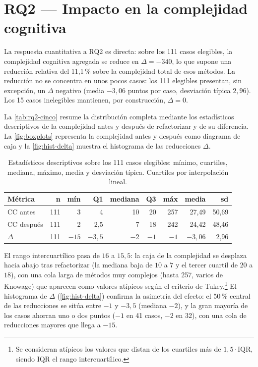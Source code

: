 \section{RQ2 — Impacto en la complejidad cognitiva}
\label{sec:resultados-rq2}
La respuesta cuantitativa a RQ2 es directa: sobre los 111 casos elegibles, la
complejidad cognitiva agregada se reduce en $\Delta = -340$, lo que
supone una reducción relativa del 11{,}1\,\% sobre la complejidad total de esos
métodos. La reducción no se concentra en unos pocos
casos: los 111 elegibles presentan, sin excepción, un $\Delta$ negativo
(media $-3{,}06$ puntos por caso, desviación típica $2{,}96$). Los 15 casos
inelegibles mantienen, por construcción, $\Delta = 0$.

La \autoref{tab:rq2-cinco} resume la distribución completa mediante los
estadísticos descriptivos de la complejidad antes y después de refactorizar y
de su diferencia. La \autoref{fig:boxplots} representa la complejidad antes y
después como diagrama de caja y la \autoref{fig:hist-delta} muestra el
histograma de las reducciones $\Delta$.

\begin{table}[ht]
\centering
\caption{Estadísticos descriptivos sobre los 111 casos elegibles:
mínimo, cuartiles, mediana, máximo, media y desviación típica. Cuartiles por
interpolación lineal.}
\label{tab:rq2-cinco}
\begin{tabular}{@{}lrrrrrrrr@{}}
\toprule
\textbf{Métrica} & \textbf{n} & \textbf{mín} & \textbf{Q1} & \textbf{mediana} & \textbf{Q3} & \textbf{máx} & \textbf{media} & \textbf{sd} \\
\midrule
CC antes   & 111 & 3   & 4      & 10 & 20 & 257 & 27{,}49 & 50{,}69 \\
CC después & 111 & 2   & 2{,}5  & 7  & 18 & 242 & 24{,}42 & 48{,}46 \\
$\Delta$   & 111 & $-15$ & $-3{,}5$ & $-2$ & $-1$ & $-1$ & $-3{,}06$ & 2{,}96 \\
\bottomrule
\end{tabular}
\end{table}

El rango intercuartílico pasa de $16$ a $15{,}5$: la
caja de la complejidad se desplaza hacia abajo tras refactorizar (la mediana
baja de $10$ a $7$ y el tercer cuartil de $20$ a $18$), con una
cola larga de métodos muy complejos (hasta 257, varios de Knowage) que
aparecen como valores atípicos según el criterio de Tukey.\footnote{Se
consideran atípicos los valores que distan de los cuartiles más de
$1{,}5\cdot\mathrm{IQR}$, siendo IQR el rango intercuartílico.} El histograma de
$\Delta$ (\autoref{fig:hist-delta}) confirma la asimetría del efecto: el 50\,\% central de las reducciones
se sitúa entre $-1$ y $-3{,}5$ (mediana $-2$), y la gran mayoría de los casos
ahorran uno o dos puntos ($-1$ en 41 casos, $-2$ en 32), con una cola de
reducciones mayores que llega a $-15$.


